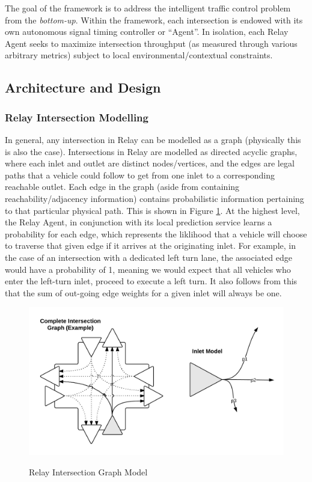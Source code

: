\documentclass{report}
\begin{document}
The goal of the framework is to address the intelligent traffic control problem from the \emph{bottom-up}.
Within the framework, each intersection is endowed with its own autonomous signal timing controller or ``Agent''.
In isolation, each Relay Agent seeks to maximize intersection throughput (as measured through various arbitrary metrics) subject to local environmental/contextual constraints. \\

\subsection{Architecture and Design}
\subsubsection{Relay Intersection Modelling}

In general, any intersection in Relay can be modelled as a graph (physically this is also the case).
Intersections in Relay are modelled as directed acyclic graphs, where each inlet and outlet are distinct nodes/vertices, and the edges are legal paths that a vehicle could follow to get from one inlet to a corresponding reachable outlet.
Each edge in the graph (aside from containing reachability/adjacency information) contains probabilistic information pertaining to that particular physical path.
This is shown in Figure \ref{fig:Relay_Intersection_Graph}.
At the highest level, the Relay Agent, in conjunction with its local prediction service learns a probability for each edge, which represents the liklihood that a vehicle will choose to traverse that given edge if it arrives at the originating inlet.
For example, in the case of an intersection with a dedicated left turn lane, the associated edge would have a probability of 1, meaning we would expect that all vehicles who enter the left-turn inlet, proceed to execute a left turn.
It also follows from this that the sum of out-going edge weights for a given inlet will always be one. \\

\begin{figure}[H]
	\caption{Relay Intersection Graph Model}
	\includegraphics[width=\textwidth]{figures/Relay_Intersection_Graph.png}
	\label{fig:Relay_Intersection_Graph}
\end{figure}
\end{document}
